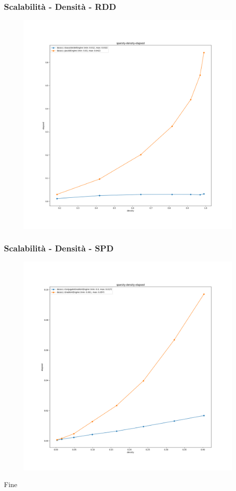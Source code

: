 \documentclass{beamer}
\begin{document}
\begin{frame}
\frametitle{Scalabilit\`a - Densit\`a - RDD}
\begin{figure}
  \centering
  \includegraphics[width=0.7\linewidth]{images/001-sparsity-density-elapsed.png}
\end{figure}
\end{frame}

\begin{frame}
\frametitle{Scalabilit\`a - Densit\`a - SPD}
\begin{figure}
  \centering
  \includegraphics[width=0.7\linewidth]{images/002-sparsity-density-elapsed.png}
\end{figure}
\end{frame}

\begin{frame}
\centering
\Huge
Fine
\end{frame}
\end{document}
